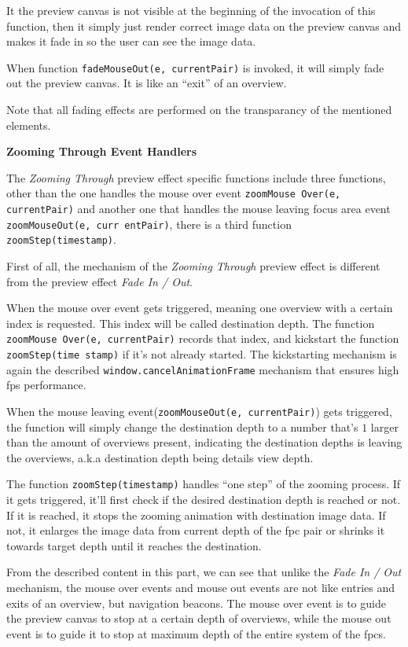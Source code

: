 It the preview canvas is not visible at the beginning of the invocation of this function, then it simply just render correct image data on the preview canvas and makes it fade in so the user can see the image data.

When function \texttt{fadeMouseOut(e, currentPair)} is invoked, it will simply fade out the preview canvas. It is like an ``exit'' of an overview.

Note that all fading effects are performed on the transparancy of the mentioned elements.

\textbf{Zooming Through Event Handlers}

The \emph{Zooming Through} preview effect specific functions include three functions, other than the one handles the mouse over event \texttt{zoomMouse Over(e, currentPair)} and another one that handles the mouse leaving focus area event \texttt{zoomMouseOut(e, curr entPair)}, there is a third function \texttt{zoomStep(timestamp)}.

First of all, the mechanism of the \emph{Zooming Through} preview effect is different from the preview effect \emph{Fade In / Out}.

When the mouse over event gets triggered, meaning one overview with a certain index is requested. This index will be called destination depth. The function \texttt{zoomMouse Over(e, currentPair)} records that index, and kickstart the function \texttt{zoomStep(time stamp)} if it's not already started. The kickstarting mechanism is again the described \texttt{window.cancelAnimationFrame} mechanism that ensures high \gls{fps} performance.

When the mouse leaving event(\texttt{zoomMouseOut(e, currentPair)}) gets triggered, the function will simply change the destination depth to a number that's $1$ larger than the amount of overviews present, indicating the destination depths is leaving the overviews, a.k.a destination depth being details view depth.

The function \texttt{zoomStep(timestamp)} handles ``one step'' of the zooming process. If it gets triggered, it'll first check if the desired destination depth is reached or not. If it is reached, it stops the zooming animation with destination image data. If not, it enlarges the image data from current depth of the \gls{fpc} pair or shrinks it towards target depth until it reaches the destination.

From the described content in this part, we can see that unlike the \emph{Fade In / Out} mechanism, the mouse over events and mouse out events are not like entries and exits of an overview, but navigation beacons. The mouse over event is to guide the preview canvas to stop at a certain depth of overviews, while the mouse out event is to guide it to stop at maximum depth of the entire system of the \gls{fpc}s.

